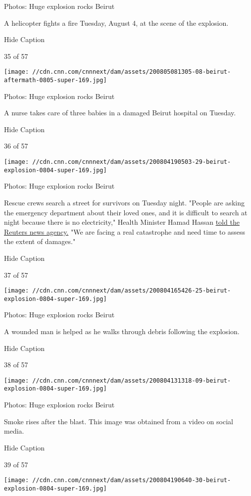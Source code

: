 Photos: Huge explosion rocks Beirut

A helicopter fights a fire Tuesday, August 4, at the scene of the
explosion.

Hide Caption

35 of 57

\texttt{[image: //cdn.cnn.com/cnnnext/dam/assets/200805081305-08-beirut-aftermath-0805-super-169.jpg]}

Photos: Huge explosion rocks Beirut

A nurse takes care of three babies in a damaged Beirut hospital on
Tuesday.

Hide Caption

36 of 57

\texttt{[image: //cdn.cnn.com/cnnnext/dam/assets/200804190503-29-beirut-explosion-0804-super-169.jpg]}

Photos: Huge explosion rocks Beirut

Rescue crews search a street for survivors on Tuesday night. "People are
asking the emergency department about their loved ones, and it is
difficult to search at night because there is no electricity," Health
Minister Hamad Hassan
\href{https://www.cnn.com/middleeast/live-news/lebanon-beirut-explosion-live-updates-dle-intl/h_191ad60f239ae9b49e4332022ce8db8c}{told
the Reuters news agency.} "We are facing a real catastrophe and need
time to assess the extent of damages."

Hide Caption

37 of 57

\texttt{[image: //cdn.cnn.com/cnnnext/dam/assets/200804165426-25-beirut-explosion-0804-super-169.jpg]}

Photos: Huge explosion rocks Beirut

A wounded man is helped as he walks through debris following the
explosion.

Hide Caption

38 of 57

\texttt{[image: //cdn.cnn.com/cnnnext/dam/assets/200804131318-09-beirut-explosion-0804-super-169.jpg]}

Photos: Huge explosion rocks Beirut

Smoke rises after the blast. This image was obtained from a video on
social media.

Hide Caption

39 of 57

\texttt{[image: //cdn.cnn.com/cnnnext/dam/assets/200804190640-30-beirut-explosion-0804-super-169.jpg]}

